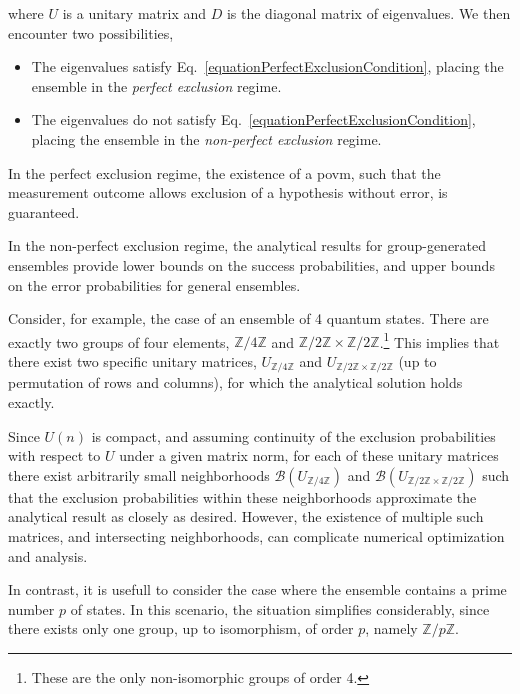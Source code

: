 \documentclass[12pt,letterpaper]{article}
\begin{document}
where $U$ is a unitary matrix and $D$ is the diagonal matrix of eigenvalues. We then encounter two possibilities,
\begin{itemize}
	\item The eigenvalues satisfy Eq.~\eqref{equationPerfectExclusionCondition}, placing the ensemble in the \emph{perfect exclusion} regime.
	\item The eigenvalues do not satisfy Eq.~\eqref{equationPerfectExclusionCondition}, placing the ensemble in the \emph{non-perfect exclusion} regime.
\end{itemize}

In the perfect exclusion regime, the existence of a \gls{povm}, such that the measurement outcome allows exclusion of a hypothesis without error, is guaranteed.

In the non-perfect exclusion regime, the analytical results for group-generated ensembles provide lower bounds on the success probabilities, and upper bounds on the error probabilities for general ensembles.

Consider, for example, the case of an ensemble of 4 quantum states. There are exactly two groups of four elements, $\mathbb{Z}/4\mathbb{Z}$ and $\mathbb{Z}/2\mathbb{Z} \times \mathbb{Z}/2\mathbb{Z}$.\footnote{These are the only non-isomorphic groups of order 4.} This implies that there exist two specific unitary matrices, $U_{\mathbb{Z}/4\mathbb{Z}}$ and $U_{\mathbb{Z}/2\mathbb{Z} \times \mathbb{Z}/2\mathbb{Z}}$ (up to permutation of rows and columns), for which the analytical solution holds exactly.

Since $U(n)$ is compact, and assuming continuity of the exclusion probabilities with respect to $U$ under a given matrix norm, for each of these unitary matrices there exist arbitrarily small neighborhoods $\mathcal{B}(U_{\mathbb{Z}/4\mathbb{Z}})$ and $\mathcal{B}(U_{\mathbb{Z}/2\mathbb{Z} \times \mathbb{Z}/2\mathbb{Z}})$ such that the exclusion probabilities within these neighborhoods approximate the analytical result as closely as desired. However, the existence of multiple such matrices, and intersecting neighborhoods, can complicate numerical optimization and analysis.

In contrast, it is usefull to consider the case where the ensemble contains a prime number $p$ of states. In this scenario, the situation simplifies considerably, since there exists only one group, up to isomorphism, of order $p$, namely $\mathbb{Z}/p\mathbb{Z}$.
\end{document}
